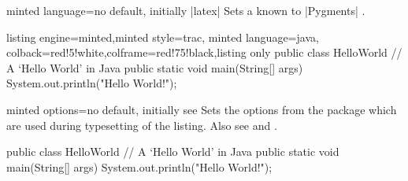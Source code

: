 \begin{docTcbKey}{minted language}{=}{no default, initially |latex|}
Sets a  known to |Pygments| \cite{pygments:web}.
\begin{dispExample}
\begin{tcblisting}{listing engine=minted,minted style=trac,
  minted language=java,
  colback=red!5!white,colframe=red!75!black,listing only}
    public class HelloWorld {
      // A `Hello World' in Java
      public static void main(String[] args) {
        System.out.println("Hello World!");
      }
    }
\end{tcblisting}
\end{dispExample}
\end{docTcbKey}


\begin{docTcbKey}[][doc updated={2021-12-15}]{minted options}{=}{no default, initially
    \linebreak see }
  Sets the options from the package  \cite{poore:minted}
  which are used during typesetting of the listing.
  Also see  and .
\begin{dispExample}

\begin{myjava}
  public class HelloWorld {
    // A `Hello World' in Java
    public static void main(String[] args) {
      System.out.println("Hello World!");
    }
  }
\end{myjava}
\end{dispExample}
\end{docTcbKey}


